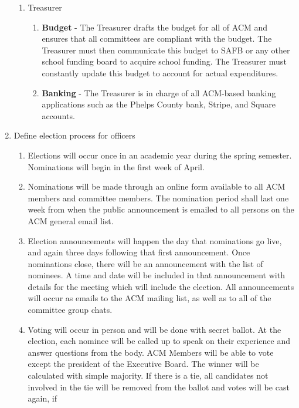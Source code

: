 \begin{enumerate}[label=\Alph*.]
\begin{enumerate}[label=\arabic*.]
      \item Treasurer
        \begin{enumerate}[label=\alph*.]
          \item \textbf{Budget} - The Treasurer drafts the budget for all of ACM
            and ensures that all committees are compliant with the budget. The
            Treasurer must then communicate this budget to SAFB or any other
            school funding board to acquire school funding. The Treasurer must
            constantly update this budget to account for actual expenditures.
          \item \textbf{Banking} - The Treasurer is in charge of all ACM-based
            banking applications such as the Phelps County bank, Stripe, and
            Square accounts.
        \end{enumerate}
    \end{enumerate}
  \item Define election process for officers
    \begin{enumerate}[label=\arabic*.]
      \item Elections will occur once in an academic year during the spring
      semester. Nominations will begin in the first week of April.
      \item Nominations will be made through an online form available to all ACM
      members and committee members. The nomination period shall last one week
      from when the public announcement is emailed to all persons on the ACM
      general email list.
      \item Election announcements will happen the day that nominations go live,
      and again three days following that first announcement. Once nominations
      close, there will be an announcement with the list of nominees. A time and
      date will be included in that announcement with details for the meeting
      which will include the election. All announcements will occur as emails to
      the ACM mailing list, as well as to all of the committee group chats.
      \item Voting will occur in person and will be done with secret ballot. At
      the election, each nominee will be called up to speak on their experience
      and answer questions from the body. ACM Members will be able to vote
      except the president of the Executive Board. The winner will be calculated
      with simple majority. If there is a tie, all candidates not involved in
      the tie will be removed from the ballot and votes will be cast again, if

\end{enumerate}
\end{enumerate}
